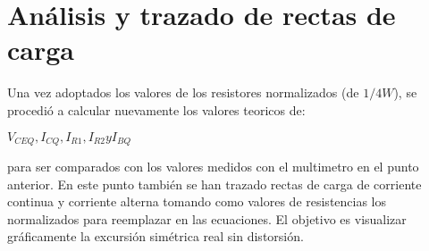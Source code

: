 \section{Análisis y trazado de rectas de carga}
\begin{multicols}{2}
        \sangria{} Una vez adoptados los valores de los resistores normalizados (de $1/4 W$), se procedió a calcular nuevamente los valores teoricos de:
        \begin{center}
            $V_{CEQ}, I_{CQ}, I_{R1}, I_{R2} y I_{BQ}$
        \end{center}
        para ser comparados con los valores medidos con el multimetro en el punto anterior.
        \sangria{} En este punto también se han trazado rectas de carga de corriente continua y corriente alterna tomando como valores de resistencias los normalizados para reemplazar en las ecuaciones. El objetivo es visualizar gráficamente la excursión simétrica real sin distorsión.
\end{multicols}
